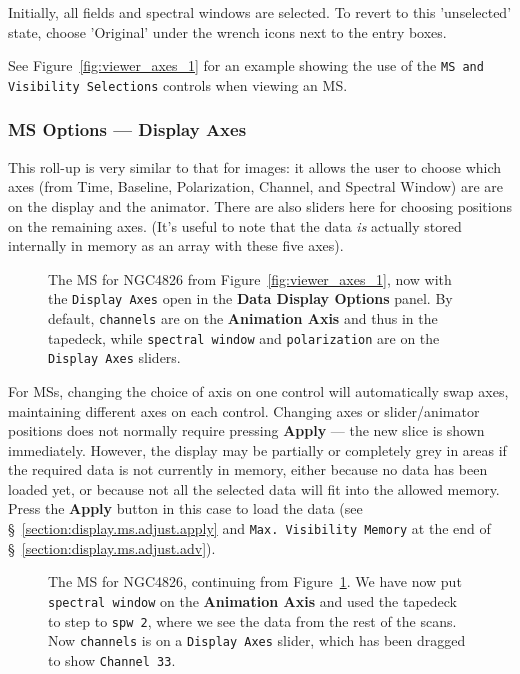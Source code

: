 Initially, all fields and spectral windows are selected.  To revert to
this 'unselected' state, choose 'Original' under the wrench
icons next to the entry boxes.

See Figure~\ref{fig:viewer_axes_1} for an example showing the use
of the {\tt MS and Visibility Selections} controls when 
viewing an MS.

\subsubsection{MS Options --- Display Axes}
\label{section:display.ms.adjust.axes}

This roll-up is very similar to that for images: it allows the user to
choose which axes (from Time, Baseline, Polarization, Channel, and
Spectral Window) are are on the display and the animator.  There are
also sliders here for choosing positions on the remaining axes.  (It's 
useful to note that the data {\it is} actually stored internally in
memory as an array with these five axes).

\begin{figure}[h!]
\begin{center}
\caption{\label{fig:viewer_axes_2} 
The MS for NGC4826 from Figure~\ref{fig:viewer_axes_1}, now with the
{\tt Display Axes} open in the {\bf Data Display Options} panel.  By
default, {\tt channels} are on the {\bf Animation Axis} and thus in
the tapedeck, while {\tt spectral window} and {\tt polarization} are
on the {\tt Display Axes} sliders. } \hrulefill
\end{center}
\end{figure}

For MSs, changing the choice of axis on one control will automatically
swap axes, maintaining different axes on each control.  Changing axes
or slider/animator positions does not normally require pressing
{\bf Apply} --- the new slice is shown immediately.  
However, the display may be 
partially or completely grey in areas if the required data is not
currently in memory, either because no data has been loaded yet, or
because not all the selected data will fit into the allowed memory.
Press the {\bf Apply} button in this case to load the data
(see \S~\ref{section:display.ms.adjust.apply} and 
{\tt Max. Visibility Memory} at the end of 
\S~\ref{section:display.ms.adjust.adv}).

\begin{figure}[h!]
\begin{center}
\caption{\label{fig:viewer_axes_3} The MS for NGC4826,
continuing from Figure~\ref{fig:viewer_axes_2}.  
We have now put {\tt spectral window} on the {\bf Animation Axis} 
and used the tapedeck to step to {\tt spw 2}, where we see the
data from the rest of the scans.  Now {\tt channels} is on a
{\tt Display Axes} slider, which has been dragged to show
{\tt Channel 33}.}
\hrulefill
\end{center}
\end{figure}

